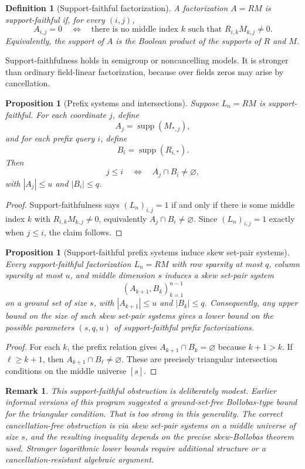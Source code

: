 \documentclass[11pt]{article}
\newtheorem{proposition}[theorem]{Proposition}
\newtheorem{definition}[theorem]{Definition}
\newtheorem{remark}[theorem]{Remark}
\begin{document}
\begin{definition}[Support-faithful factorization]
A factorization $A=RM$ is support-faithful if, for every $(i,j)$,
\[
A_{i,j}=0
\quad\Longleftrightarrow\quad
\text{there is no middle index }k\text{ such that }R_{i,k}M_{k,j}\ne0.
\]
Equivalently, the support of $A$ is the Boolean product of the supports of $R$ and $M$.
\end{definition}

Support-faithfulness holds in semigroup or noncancelling models. It is stronger than ordinary field-linear factorization, because over fields zeros may arise by cancellation.

\begin{proposition}[Prefix systems and intersections]
Suppose $L_n=RM$ is support-faithful. For each coordinate $j$, define
\[
A_j=\operatorname{supp}(M_{*,j}),
\]
and for each prefix query $i$, define
\[
B_i=\operatorname{supp}(R_{i,*}).
\]
Then
\[
j\le i
\quad\Longleftrightarrow\quad
A_j\cap B_i\ne\varnothing,
\]
with $|A_j|\le u$ and $|B_i|\le q$.
\end{proposition}

\begin{proof}
Support-faithfulness says $(L_n)_{i,j}=1$ if and only if there is some middle index $k$ with $R_{i,k}M_{k,j}\ne0$, equivalently $A_j\cap B_i\ne\varnothing$. Since $(L_n)_{i,j}=1$ exactly when $j\le i$, the claim follows.
\end{proof}

\begin{proposition}[Support-faithful prefix systems induce skew set-pair systems]
Every support-faithful factorization $L_n=RM$ with row sparsity at most $q$, column sparsity at most $u$, and middle dimension $s$ induces a skew set-pair system
\[
(A_{k+1},B_k)_{k=1}^{n-1}
\]
on a ground set of size $s$, with $|A_{k+1}|\le u$ and $|B_k|\le q$. Consequently, any upper bound on the size of such skew set-pair systems gives a lower bound on the possible parameters $(s,q,u)$ of support-faithful prefix factorizations.
\end{proposition}

\begin{proof}
For each $k$, the prefix relation gives $A_{k+1}\cap B_k=\varnothing$ because $k+1>k$. If $\ell\ge k+1$, then $A_{k+1}\cap B_\ell\ne\varnothing$. These are precisely triangular intersection conditions on the middle universe $[s]$.
\end{proof}

\begin{remark}
This support-faithful obstruction is deliberately modest. Earlier informal versions of this program suggested a ground-set-free Bollobas-type bound for the triangular condition. That is too strong in this generality. The correct cancellation-free obstruction is via skew set-pair systems on a middle universe of size $s$, and the resulting inequality depends on the precise skew-Bollobas theorem used. Stronger logarithmic lower bounds require additional structure or a cancellation-resistant algebraic argument.
\end{remark}
\end{document}
